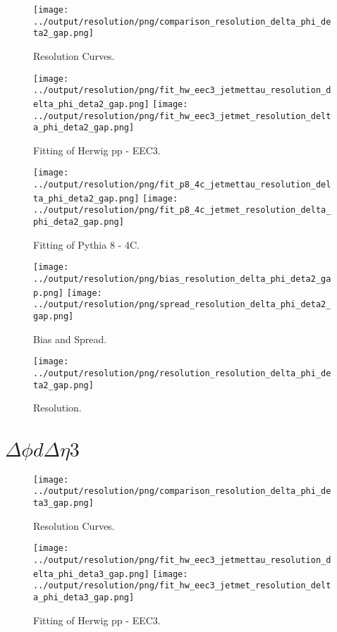 \documentclass[11pt]{book}
\begin{document}
\begin{figure}[ht]
\centering
\texttt{[image: ../output/resolution/png/comparison\_resolution\_delta\_phi\_deta2\_gap.png]}
\caption{Resolution Curves.}
\end{figure}


\begin{figure}[ht]
\centering
\texttt{[image: ../output/resolution/png/fit\_hw\_eec3\_jetmettau\_resolution\_delta\_phi\_deta2\_gap.png]}
\texttt{[image: ../output/resolution/png/fit\_hw\_eec3\_jetmet\_resolution\_delta\_phi\_deta2\_gap.png]}
\caption{Fitting of Herwig pp - EEC3.}
\end{figure}

\begin{figure}[ht]
\centering
\texttt{[image: ../output/resolution/png/fit\_p8\_4c\_jetmettau\_resolution\_delta\_phi\_deta2\_gap.png]}
\texttt{[image: ../output/resolution/png/fit\_p8\_4c\_jetmet\_resolution\_delta\_phi\_deta2\_gap.png]}
\caption{Fitting of Pythia 8 - 4C.}
\end{figure}

\begin{figure}[ht]
\centering
\texttt{[image: ../output/resolution/png/bias\_resolution\_delta\_phi\_deta2\_gap.png]}
\texttt{[image: ../output/resolution/png/spread\_resolution\_delta\_phi\_deta2\_gap.png]}
\caption{Bias and Spread.}
\end{figure}


\begin{figure}[ht]
\centering
\texttt{[image: ../output/resolution/png/resolution\_resolution\_delta\_phi\_deta2\_gap.png]}
\caption{Resolution.}
\end{figure}
\clearpage


\section{$\Delta\phi d\Delta\eta 3$}

\begin{figure}[ht]
\centering
\texttt{[image: ../output/resolution/png/comparison\_resolution\_delta\_phi\_deta3\_gap.png]}
\caption{Resolution Curves.}
\end{figure}


\begin{figure}[ht]
\centering
\texttt{[image: ../output/resolution/png/fit\_hw\_eec3\_jetmettau\_resolution\_delta\_phi\_deta3\_gap.png]}
\texttt{[image: ../output/resolution/png/fit\_hw\_eec3\_jetmet\_resolution\_delta\_phi\_deta3\_gap.png]}
\caption{Fitting of Herwig pp - EEC3.}
\end{figure}
\end{document}
